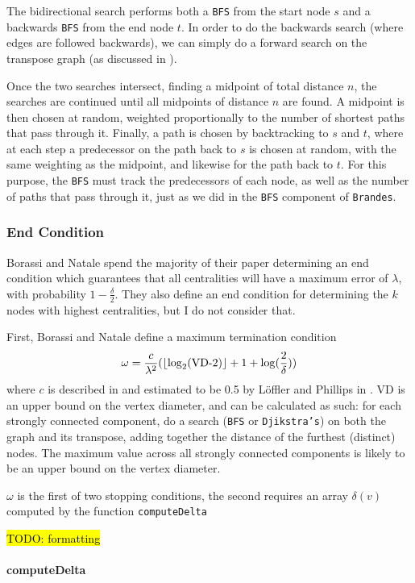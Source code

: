 \documentclass[12pt,a4paper,twoside,openright]{report}
\newcommand{\todo}[1]{\hl{TODO: #1}}
\newcommand{\ttt}[1]{\texttt{#1}}
\DeclarePairedDelimiter\floor{\lfloor}{\rfloor}
\begin{document}
	The bidirectional search performs both a \ttt{BFS} from the start node $s$ and a backwards \ttt{BFS} from the end node $t$. In order to do the backwards search (where edges are followed backwards), we can simply do a forward search on the transpose graph (as discussed in ).
	
	Once the two searches intersect, finding a midpoint of total distance $n$, the searches are continued until all midpoints of distance $n$ are found. A midpoint is then chosen at random, weighted proportionally to the number of shortest paths that pass through it. Finally, a path is chosen by backtracking to $s$ and $t$, where at each step a predecessor on the path back to $s$ is chosen at random, with the same weighting as the midpoint, and likewise for the path back to $t$. For this purpose, the \ttt{BFS} must track the predecessors of each node, as well as the number of paths that pass through it, just as we did in the \ttt{BFS} component of \ttt{Brandes}.
	
	\subsubsection{End Condition}
	Borassi and Natale spend the majority of their paper determining an end condition which guarantees that all centralities will have a maximum error of $\lambda$, with probability $1-\frac{\delta}{2}$. They also define an end condition for determining the $k$ nodes with highest centralities, but I do not consider that.
	
	First, Borassi and Natale define a maximum termination condition \begin{equation}
		\omega = \frac{c}{\lambda^2}(\floor{\log_2(\text{VD-2})}+1+\log(\frac{2}{\delta}))
	\end{equation}
	where $c$ is described in \cite{riondato} and estimated to be 0.5 by L\"offler and Phillips in \cite{loffler}. VD is an upper bound on the vertex diameter, and can be calculated as such: for each strongly connected component, do a search (\ttt{BFS} or \ttt{Djikstra's}) on both the graph and its transpose, adding together the distance of the furthest (distinct) nodes. The maximum value across all strongly connected components is likely to be an upper bound on the vertex diameter.
	
	$\omega$ is the first of two stopping conditions, the second requires an array $\delta(v)$ computed by the function \ttt{computeDelta}
	
	\todo{formatting}
	\paragraph{computeDelta}
	
\end{document}
